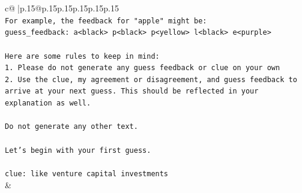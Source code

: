 \documentclass{article}
\begin{document}
{\begin{supertabular}{c@{$\;$}|p{.15\linewidth}@{}p{.15\linewidth}p{.15\linewidth}p{.15\linewidth}p{.15\linewidth}p{.15\linewidth}}
{{{\\ 
\texttt{For example, the feedback for "apple" might be:} \\
\texttt{guess\_feedback: a<black> p<black> p<yellow> l<black> e<purple>} \\
\\ 
\texttt{Here are some rules to keep in mind:} \\
\texttt{1. Please do not generate any guess feedback or clue on your own} \\
\texttt{2. Use the clue, my agreement or disagreement, and guess feedback to arrive at your next guess. This should be reflected in your explanation as well.} \\
\\ 
\texttt{Do not generate any other text.} \\
\\ 
\texttt{Let's begin with your first guess.} \\
\\ 
\texttt{clue: like venture capital investments} \\
            }
        }
    }
    & \\ \\


\end{supertabular}}
\end{document}
